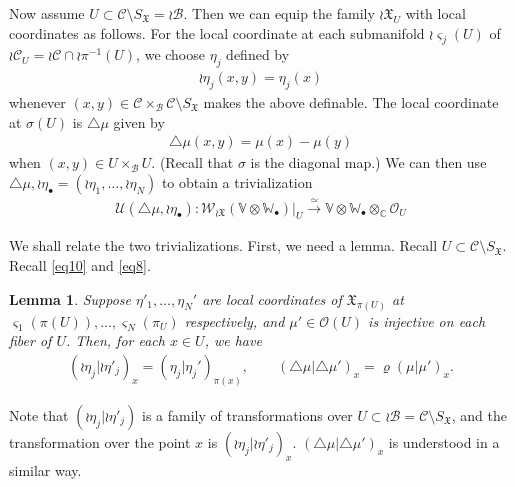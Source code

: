 \documentclass[12pt,a4paper,notitlepage]{article}
\theoremstyle{definition}
\theoremstyle{plain}
\newtheorem{lm}[df]{Lemma}
\newcommand{\fk}{\mathfrak}
\newcommand{\mc}{\mathcal}
\newcommand{\scr}{\mathscr}
\newcommand{\sgm}{\varsigma}
\newcommand{\SX}{{S_{\fk X}}}
\newcommand{\blt}{\bullet}
\newcommand{\Vbb}{\mathbb V}
\newcommand{\Wbb}{\mathbb W}
\newcommand{\Cbb}{\mathbb C}
\numberwithin{equation}{section}
\begin{document}
Now assume $U\subset\mc C\setminus\SX=\wr\mc B$. Then we can equip the family $\wr\fk X_U$ with local coordinates as follows. For the local coordinate at each submanifold $\wr\sgm_j(U)$ of $\wr\mc C_U=\wr\mc C\cap\wr\pi^{-1}(U)$, we choose $\eta_j$ defined by 
\begin{gather}
\wr\eta_j(x,y)=\eta_j(x)
\end{gather}
whenever $(x,y)\in\mc C\times_{\mc B}\mc C\setminus\SX$ makes the above definable. The local coordinate at $\sigma(U)$ is $\triangle\mu$ given by  
\begin{align}
\triangle\mu(x,y)=\mu(x)-\mu(y)\label{eq9}
\end{align}
when $(x,y)\in U\times_{\mc B} U$. (Recall that $\sigma$ is the diagonal map.) We can then use $\triangle\mu,\wr\eta_\blt=(\wr\eta_1,\dots,\wr\eta_N)$ to obtain a trivialization
\begin{align}
\boxed{~\mc U(\triangle\mu,\wr\eta_\blt):\scr W_{\wr\fk X}(\Vbb\otimes\Wbb_\blt)|_U\xrightarrow{\simeq} \Vbb\otimes\Wbb_\blt\otimes_\Cbb\scr O_U~}\label{eq17}
\end{align}


We shall relate the two trivializations. First, we need a lemma. Recall $U\subset\mc C\setminus\SX$. Recall \eqref{eq10} and \eqref{eq8}.


\begin{lm}\label{lb3}
Suppose $\eta'_1,\dots,\eta_N'$ are local coordinates of $\fk X_{\pi(U)}$ at $\sgm_1(\pi(U)),\dots,\sgm_N(\pi_U)$ respectively, and $\mu'\in\scr O(U)$ is injective on each fiber of $U$. Then, for each $x\in U$, we have
\begin{gather*}
(\wr\eta_j|\wr\eta'_j)_x=(\eta_j|\eta_j')_{\pi(x)},\qquad (\triangle\mu|\triangle\mu')_x=\varrho(\mu|\mu')_x.
\end{gather*}
\end{lm}

Note that $(\wr\eta_j|\wr\eta'_j)$ is a family of transformations over $U\subset\wr\mc B=\mc C\setminus\SX$, and the transformation over the point $x$ is $(\wr\eta_j|\wr\eta'_j)_x$. $(\triangle\mu|\triangle\mu')_x$ is understood in a similar way.
\end{document}
